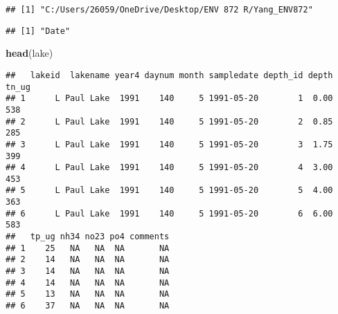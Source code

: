 \documentclass[]{article}
\newenvironment{Shaded}{\begin{snugshade}}{\end{snugshade}}
\newcommand{\CommentTok}[1]{\textcolor[rgb]{0.56,0.35,0.01}{\textit{#1}}}
\newcommand{\DataTypeTok}[1]{\textcolor[rgb]{0.13,0.29,0.53}{#1}}
\newcommand{\KeywordTok}[1]{\textcolor[rgb]{0.13,0.29,0.53}{\textbf{#1}}}
\newcommand{\NormalTok}[1]{#1}
\newcommand{\OperatorTok}[1]{\textcolor[rgb]{0.81,0.36,0.00}{\textbf{#1}}}
\newcommand{\StringTok}[1]{\textcolor[rgb]{0.31,0.60,0.02}{#1}}
\begin{document}
\begin{Shaded}
\end{Shaded}

\begin{verbatim}
## [1] "C:/Users/26059/OneDrive/Desktop/ENV 872 R/Yang_ENV872"
\end{verbatim}

\begin{Shaded}
\end{Shaded}

\begin{verbatim}
## [1] "Date"
\end{verbatim}

\begin{Shaded}
\begin{Highlighting}[]
\KeywordTok{head}\NormalTok{(lake)}
\end{Highlighting}
\end{Shaded}

\begin{verbatim}
##   lakeid  lakename year4 daynum month sampledate depth_id depth tn_ug
## 1      L Paul Lake  1991    140     5 1991-05-20        1  0.00   538
## 2      L Paul Lake  1991    140     5 1991-05-20        2  0.85   285
## 3      L Paul Lake  1991    140     5 1991-05-20        3  1.75   399
## 4      L Paul Lake  1991    140     5 1991-05-20        4  3.00   453
## 5      L Paul Lake  1991    140     5 1991-05-20        5  4.00   363
## 6      L Paul Lake  1991    140     5 1991-05-20        6  6.00   583
##   tp_ug nh34 no23 po4 comments
## 1    25   NA   NA  NA       NA
## 2    14   NA   NA  NA       NA
## 3    14   NA   NA  NA       NA
## 4    14   NA   NA  NA       NA
## 5    13   NA   NA  NA       NA
## 6    37   NA   NA  NA       NA
\end{verbatim}
\end{document}
